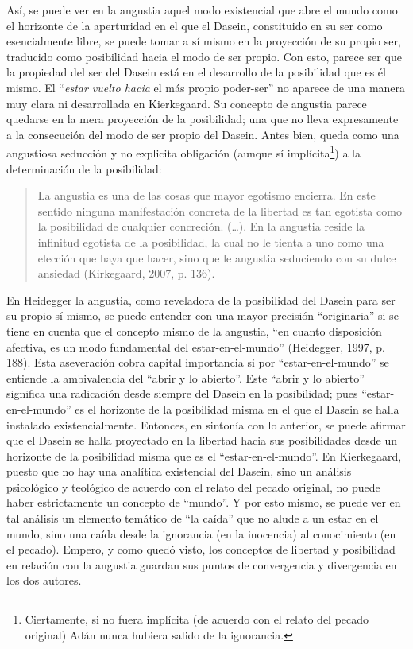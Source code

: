 \begin{refsection}
Así, se puede ver en la angustia aquel modo existencial que abre el mundo como el horizonte de la aperturidad en el que el Dasein, constituido en su ser como esencialmente libre, se puede tomar a sí mismo en la proyección de su propio ser, traducido como posibilidad hacia el modo de ser propio. Con esto, parece ser que la propiedad del ser del Dasein está en el desarrollo de la posibilidad que es él mismo. El ``\emph{estar vuelto hacia} el más propio poder-ser'' no aparece de una manera muy clara ni desarrollada en Kierkegaard. Su concepto de angustia parece quedarse en la mera proyección de la posibilidad; una que no lleva expresamente a la consecución del modo de ser propio del Dasein. Antes bien, queda como una angustiosa seducción y no explicita obligación (aunque sí implícita\footnote{Ciertamente, si no fuera implícita (de acuerdo con el relato del pecado original) Adán nunca hubiera salido de la ignorancia.}) a la determinación de la posibilidad:

\begin{quote}
La angustia es una de las cosas que mayor egotismo encierra. En este sentido ninguna manifestación concreta de la libertad es tan egotista como la posibilidad de cualquier concreción. (\ldots{}). En la angustia reside la infinitud egotista de la posibilidad, la cual no le tienta a uno como una elección que haya que hacer, sino que le angustia seduciendo con su dulce ansiedad (Kirkegaard, 2007, p. 136).
\end{quote}

En Heidegger la angustia, como reveladora de la posibilidad del Dasein para ser su propio sí mismo, se puede entender con una mayor precisión ``originaria'' si se tiene en cuenta que el concepto mismo de la angustia, ``en cuanto disposición afectiva, es un modo fundamental del estar-en-el-mundo'' (Heidegger, 1997, p. 188). Esta aseveración cobra capital importancia si por ``estar-en-el-mundo'' se entiende la ambivalencia del ``abrir y lo abierto''. Este ``abrir y lo abierto'' significa una radicación desde siempre del Dasein en la posibilidad; pues ``estar-en-el-mundo'' es el horizonte de la posibilidad misma en el que el Dasein se halla instalado existencialmente. Entonces, en sintonía con lo anterior, se puede afirmar que el Dasein se halla proyectado en la libertad hacia sus posibilidades desde un horizonte de la posibilidad misma que es el ``estar-en-el-mundo''. En Kierkegaard, puesto que no hay una analítica existencial del Dasein, sino un análisis psicológico y teológico de acuerdo con el relato del pecado original, no puede haber estrictamente un concepto de ``mundo''. Y por esto mismo, se puede ver en tal análisis un elemento temático de ``la caída'' que no alude a un estar en el mundo, sino una caída desde la ignorancia (en la inocencia) al conocimiento (en el pecado). Empero, y como quedó visto, los conceptos de libertad y posibilidad en relación con la angustia guardan sus puntos de convergencia y divergencia en los dos autores.


\end{refsection}
